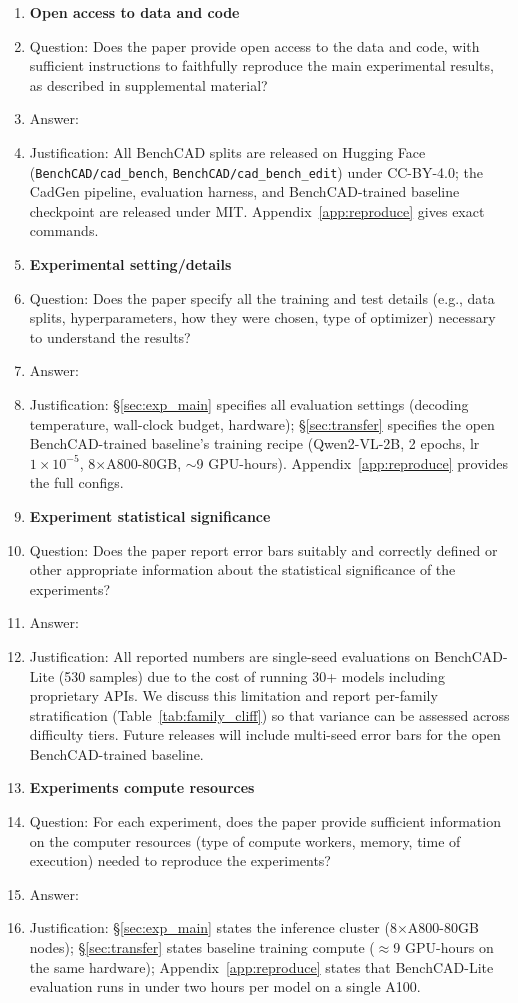 \documentclass{article}
\begin{document}
\begin{enumerate}
\item {\bf Open access to data and code}
    \item[] Question: Does the paper provide open access to the data and code, with sufficient instructions to faithfully reproduce the main experimental results, as described in supplemental material?
    \item[] Answer: \answerYes{}
    \item[] Justification: All BenchCAD splits are released on Hugging Face (\texttt{BenchCAD/cad\_bench}, \texttt{BenchCAD/cad\_bench\_edit}) under CC-BY-4.0; the CadGen pipeline, evaluation harness, and BenchCAD-trained baseline checkpoint are released under MIT. Appendix~\ref{app:reproduce} gives exact commands.


\item {\bf Experimental setting/details}
    \item[] Question: Does the paper specify all the training and test details (e.g., data splits, hyperparameters, how they were chosen, type of optimizer) necessary to understand the results?
    \item[] Answer: \answerYes{}
    \item[] Justification: \S\ref{sec:exp_main} specifies all evaluation settings (decoding temperature, wall-clock budget, hardware); \S\ref{sec:transfer} specifies the open BenchCAD-trained baseline's training recipe (Qwen2-VL-2B, 2 epochs, lr $1\times10^{-5}$, 8$\times$A800-80GB, $\sim$9 GPU-hours). Appendix~\ref{app:reproduce} provides the full configs.

\item {\bf Experiment statistical significance}
    \item[] Question: Does the paper report error bars suitably and correctly defined or other appropriate information about the statistical significance of the experiments?
    \item[] Answer: \answerNo{}
    \item[] Justification: All reported numbers are single-seed evaluations on BenchCAD-Lite (530 samples) due to the cost of running 30+ models including proprietary APIs. We discuss this limitation and report per-family stratification (Table~\ref{tab:family_cliff}) so that variance can be assessed across difficulty tiers. Future releases will include multi-seed error bars for the open BenchCAD-trained baseline.

\item {\bf Experiments compute resources}
    \item[] Question: For each experiment, does the paper provide sufficient information on the computer resources (type of compute workers, memory, time of execution) needed to reproduce the experiments?
    \item[] Answer: \answerYes{}
    \item[] Justification: \S\ref{sec:exp_main} states the inference cluster (8$\times$A800-80GB nodes); \S\ref{sec:transfer} states baseline training compute ($\approx$9 GPU-hours on the same hardware); Appendix~\ref{app:reproduce} states that BenchCAD-Lite evaluation runs in under two hours per model on a single A100.


\end{enumerate}
\end{document}
